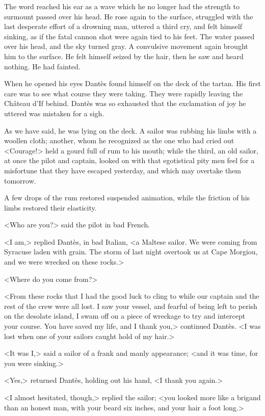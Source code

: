  The word reached his ear as a wave which he no longer had the strength to surmount passed over his head. He rose again to the surface, struggled with the last desperate effort of a drowning man, uttered a third cry, and felt himself sinking, as if the fatal cannon shot were again tied to his feet. The water passed over his head, and the sky turned gray. A convulsive movement again brought him to the surface. He felt himself seized by the hair, then he saw and heard nothing. He had fainted. 

 When he opened his eyes Dantès found himself on the deck of the tartan. His first care was to see what course they were taking. They were rapidly leaving the Château d'If behind. Dantès was so exhausted that the exclamation of joy he uttered was mistaken for a sigh. 

 As we have said, he was lying on the deck. A sailor was rubbing his limbs with a woollen cloth; another, whom he recognized as the one who had cried out <Courage!> held a gourd full of rum to his mouth; while the third, an old sailor, at once the pilot and captain, looked on with that egotistical pity men feel for a misfortune that they have escaped yesterday, and which may overtake them tomorrow. 

 A few drops of the rum restored suspended animation, while the friction of his limbs restored their elasticity. 

 <Who are you?> said the pilot in bad French. 

 <I am,> replied Dantès, in bad Italian, <a Maltese sailor. We were coming from Syracuse laden with grain. The storm of last night overtook us at Cape Morgiou, and we were wrecked on these rocks.> 

 <Where do you come from?> 

 <From these rocks that I had the good luck to cling to while our captain and the rest of the crew were all lost. I saw your vessel, and fearful of being left to perish on the desolate island, I swam off on a piece of wreckage to try and intercept your course. You have saved my life, and I thank you,> continued Dantès. <I was lost when one of your sailors caught hold of my hair.> 

 <It was I,> said a sailor of a frank and manly appearance; <and it was time, for you were sinking.> 

 <Yes,> returned Dantès, holding out his hand, <I thank you again.> 

 <I almost hesitated, though,> replied the sailor; <you looked more like a brigand than an honest man, with your beard six inches, and your hair a foot long.> 

